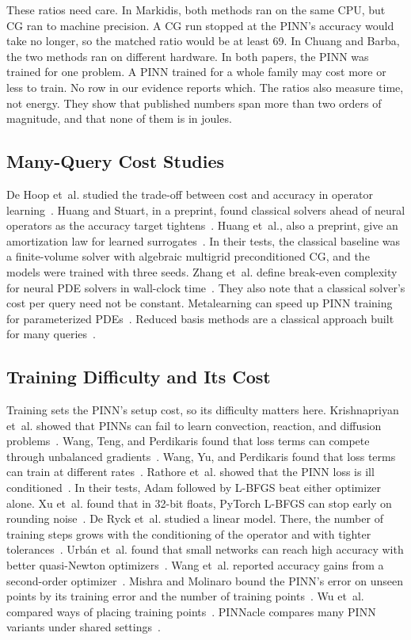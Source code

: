 \documentclass[journal]{IEEEtran}
\begin{document}
These ratios need care. In Markidis, both methods ran on the same CPU, but CG ran to machine precision. A CG run stopped at the PINN's accuracy would take no longer, so the matched ratio would be at least 69. In Chuang and Barba, the two methods ran on different hardware. In both papers, the PINN was trained for one problem. A PINN trained for a whole family may cost more or less to train. No row in our evidence reports which. The ratios also measure time, not energy. They show that published numbers span more than two orders of magnitude, and that none of them is in joules.

\subsection{Many-Query Cost Studies}
De Hoop et~al. studied the trade-off between cost and accuracy in operator learning~\cite{dehoop2022}. Huang and Stuart, in a preprint, found classical solvers ahead of neural operators as the accuracy target tightens~\cite{huangstuart2026}. Huang et~al., also a preprint, give an amortization law for learned surrogates~\cite{huang2026review}. In their tests, the classical baseline was a finite-volume solver with algebraic multigrid preconditioned CG, and the models were trained with three seeds. Zhang et~al. define break-even complexity for neural PDE solvers in wall-clock time~\cite{zhang2026}. They also note that a classical solver's cost per query need not be constant. Metalearning can speed up PINN training for parameterized PDEs~\cite{penwarden2023}. Reduced basis methods are a classical approach built for many queries~\cite{hesthaven2016}.

\subsection{Training Difficulty and Its Cost}
Training sets the PINN's setup cost, so its difficulty matters here. Krishnapriyan et~al. showed that PINNs can fail to learn convection, reaction, and diffusion problems~\cite{krishnapriyan2021}. Wang, Teng, and Perdikaris found that loss terms can compete through unbalanced gradients~\cite{wang2021gradient}. Wang, Yu, and Perdikaris found that loss terms can train at different rates~\cite{wang2022ntk}. Rathore et~al. showed that the PINN loss is ill conditioned~\cite{rathore2024}. In their tests, Adam followed by L-BFGS beat either optimizer alone. Xu et~al. found that in 32-bit floats, PyTorch L-BFGS can stop early on rounding noise~\cite{xu2025}. De Ryck et~al. studied a linear model. There, the number of training steps grows with the conditioning of the operator and with tighter tolerances~\cite{deryck2024}. Urb\'an et~al. found that small networks can reach high accuracy with better quasi-Newton optimizers~\cite{urban2025}. Wang et~al. reported accuracy gains from a second-order optimizer~\cite{wang2025soap}. Mishra and Molinaro bound the PINN's error on unseen points by its training error and the number of training points~\cite{mishra2022}. Wu et~al. compared ways of placing training points~\cite{wu2023}. PINNacle compares many PINN variants under shared settings~\cite{hao2024}.
\end{document}
